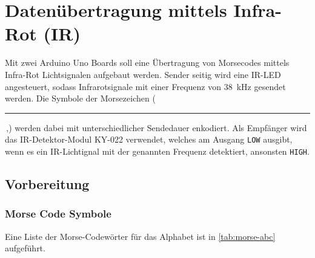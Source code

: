 \newcommand{\mdot}{\textbullet\,}
\newcommand{\mdash}{\rule[0.4ex]{0.5em}{0.2ex}\,}

\newpage
\section{Datenübertragung mittels Infra-Rot (IR)}

Mit zwei Arduino Uno Boards soll eine Übertragung von Morsecodes mittels Infra-Rot Lichtsignalen aufgebaut werden. Sender seitig wird eine IR-LED angesteuert, sodass Infrarotsignale mit einer Frequenz von \SI{38}{\kilo\hertz} gesendet werden. Die Symbole der Morsezeichen (\mdash,\textbullet) werden dabei mit unterschiedlicher Sendedauer enkodiert. Als Empfänger wird das IR-Detektor-Modul KY-022 verwendet, welches am Ausgang \lstinline!LOW! ausgibt, wenn es ein IR-Lichtignal mit der genannten Frequenz detektiert, ansonsten \lstinline!HIGH!.

\subsection{Vorbereitung}

\subsubsection{Morse Code Symbole}

Eine Liste der Morse-Codewörter für das Alphabet ist in \autoref{tab:morse-abc} aufgeführt.

